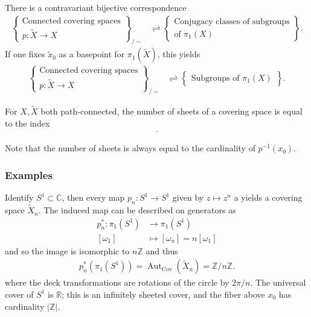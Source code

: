 \begin{fact}

There is a contravariant bijective correspondence
\begin{align*}
\left\{{\substack{
  \text{Connected covering spaces} \\
  p: \tilde X \xrightarrow{} X
}}\right\}_{/\sim}
&\rightleftharpoons
\left\{{\substack{
  \text{Conjugacy classes of subgroups} \\
  \text{of } \pi_1(X)
}}\right\}
.\end{align*}
If one fixes \(\tilde x_0\) as a basepoint for \(\pi_1(\tilde X)\), this
yields
\begin{align*}
\left\{{\substack{
  \text{Connected covering spaces} \\
  p: \tilde X \xrightarrow{} X
}}\right\}_{/\sim}
&\rightleftharpoons
\left\{{\substack{
  \text{Subgroups of } \pi_1(X)
}}\right\}
.\end{align*}

\end{fact}

\begin{proposition}

For \(X, \tilde X\) both path-connected, the number of sheets of a
covering space is equal to the index
\begin{align*}
[p^*(\pi_1(\tilde X)): \pi_1(X)]
.\end{align*}

Note that the number of sheets is always equal to the cardinality of
\(p ^{-1} (x_0)\).

\end{proposition}

\hypertarget{examples-1}{%
\subsubsection{Examples}\label{examples-1}}

\begin{example}

Identify \(S^1 \subset {\mathbb{C}}\), then every map
\(p_n: S^1 \to S^1\) given by \(z\mapsto z^n\) a yields a covering space
\(\tilde X_n\). The induced map can be described on generators as
\begin{align*}
p_n^*: \pi_1(S^1) &\to \pi_1(S^1) \\
[\omega_1] &\mapsto [\omega_n] = n[\omega_1]
\end{align*}
and so the image is isomorphic to \(n{\mathbb{Z}}\) and thus
\begin{align*}
p_n^*(\pi_1(S^1)) = {\operatorname{Aut}}_{\mathrm{Cov} }(\tilde X_n) = {\mathbb{Z}}/n{\mathbb{Z}}
.\end{align*}
where the deck transformations are rotations of the circle by
\(2\pi/n\). The universal cover of \(S^1\) is \({\mathbb{R}}\); this is
an infinitely sheeted cover, and the fiber above \(x_0\) has cardinality
\({\left\lvert {{\mathbb{Z}}} \right\rvert}\).

\end{example}

